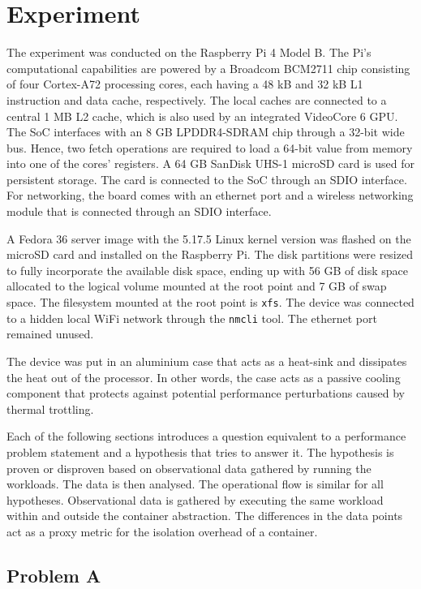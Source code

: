 \chapter{Experiment}
\label{ch:Experiment}
The experiment was conducted on the Raspberry Pi 4 Model B. 
The Pi's computational capabilities are powered by a Broadcom BCM2711 chip \cite{bcm2711-arm}
consisting of four Cortex-A72 processing cores, each having a 48 kB and 32 kB L1 instruction 
and data cache, respectively. The local caches are connected to a central 1 MB L2 cache, which is also 
used by an integrated VideoCore 6 GPU. The SoC interfaces with an 8 GB LPDDR4-SDRAM chip through a 
32-bit wide bus. Hence, two fetch operations are required to load a 64-bit value from memory into 
one of the cores' registers.
A 64 GB SanDisk UHS-1 microSD card is used for persistent storage. The card is connected 
to the SoC through an SDIO interface. For networking, the board comes with an ethernet port and a 
wireless networking module that is connected through an SDIO interface.

A Fedora 36 server image \cite{fedora-36-server} with the 5.17.5 Linux kernel version was flashed 
on the microSD card and installed on the Raspberry Pi. The disk partitions were resized to fully 
incorporate the available disk space, ending up with 56 GB of disk space allocated to the logical volume 
mounted at the root point and 7 GB of swap space. The filesystem mounted at the root point is \verb|xfs|. 
The device was connected to a hidden local WiFi network through the \verb|nmcli| tool. The 
ethernet port remained unused. 

The device was 
put in an aluminium case that acts as a heat-sink and dissipates the heat out of the processor. 
In other words, the case acts as a passive cooling component that protects against potential
performance perturbations caused by thermal trottling. 

Each of the following sections introduces a question equivalent to a performance problem 
statement and a hypothesis that tries to answer it. The hypothesis is proven or disproven based on observational data 
gathered by running the workloads. The data is then analysed. The operational flow is similar for all 
hypotheses. Observational data is gathered by executing the same workload within and outside 
the container abstraction. The differences in the data points act as a proxy metric for the 
isolation overhead of a container. 


\section{Problem A}

